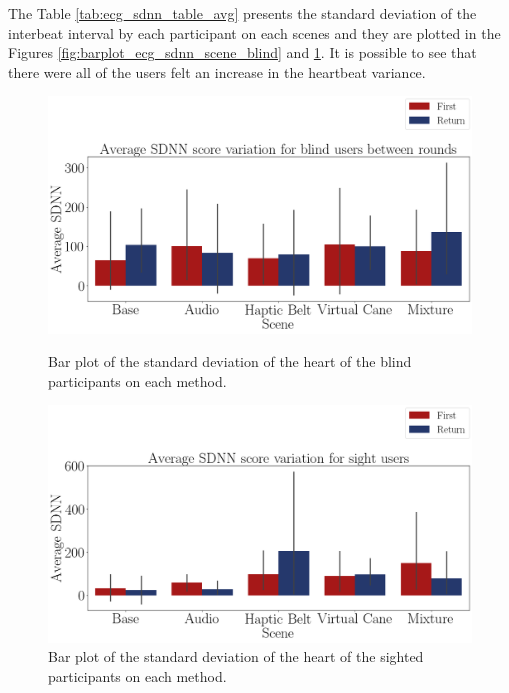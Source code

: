 The Table \ref{tab:ecg_sdnn_table_avg} presents the standard deviation of the interbeat interval by each participant on each scenes and they are plotted in the Figures \ref{fig:barplot_ecg_sdnn_scene_blind} and \ref{fig:barplot_ecg_sdnn_scene_sight}. It is possible to see that there were all of the users felt an increase in the heartbeat variance.



\begin{figure}[!htb]
    \centering
    \begin{minipage}{\textwidth}
        \centering
        \includegraphics[width = 0.8\linewidth]{Resultados/ECG/Figuras/png/barplot_ecg_sdnn_scene_blind.png}
        \caption{Bar plot of the standard deviation of the heart of the blind participants on each method.}
        \label{fig:barplot_ecg_sdnn_scene_blind}
    \end{minipage}
    \begin{minipage}{\textwidth}
        \centering
        \includegraphics[width = 0.8\linewidth]{Resultados/ECG/Figuras/png/barplot_ecg_sdnn_scene_sight.png}
        \caption{Bar plot of the standard deviation of the heart of the sighted participants on each method.}
        \label{fig:barplot_ecg_sdnn_scene_sight}
    \end{minipage}
\end{figure}

